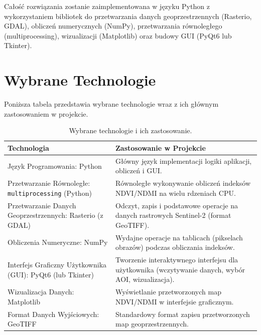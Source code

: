 \documentclass[12pt,a4paper]{article}
\begin{document}
\noindent Całość rozwiązania zostanie zaimplementowana w języku Python z wykorzystaniem bibliotek do przetwarzania danych geoprzestrzennych (Rasterio, GDAL), obliczeń numerycznych (NumPy), przetwarzania równoległego (multiprocessing), wizualizacji (Matplotlib) oraz budowy GUI (PyQt6 lub Tkinter).

\section{Wybrane Technologie}
\label{sec:technologies}
Poniższa tabela przedstawia wybrane technologie wraz z ich głównym zastosowaniem w projekcie.

\begin{table}[H]
    \centering
    \caption{Wybrane technologie i ich zastosowanie.}
    \label{tab:technologies}
    \begin{tabular}{>{\raggedright\arraybackslash}p{} >{\raggedright\arraybackslash}p{}}
        \toprule
        \textbf{Technologia} & \textbf{Zastosowanie w Projekcie} \\
        \midrule
        Język Programowania: Python & Główny język implementacji logiki aplikacji, obliczeń i GUI. \\
        \addlinespace
        Przetwarzanie Równoległe: \texttt{multiprocessing} (Python) & Równoległe wykonywanie obliczeń indeksów NDVI/NDMI na wielu rdzeniach CPU. \\
        \addlinespace
        Przetwarzanie Danych Geoprzestrzennych: Rasterio (z GDAL) & Odczyt, zapis i podstawowe operacje na danych rastrowych Sentinel-2 (format GeoTIFF). \\
        \addlinespace
        Obliczenia Numeryczne: NumPy & Wydajne operacje na tablicach (pikselach obrazów) podczas obliczania indeksów. \\
        \addlinespace
        Interfejs Graficzny Użytkownika (GUI): PyQt6 (lub Tkinter) & Tworzenie interaktywnego interfejsu dla użytkownika (wczytywanie danych, wybór AOI, wizualizacja). \\
        \addlinespace
        Wizualizacja Danych: Matplotlib & Wyświetlanie przetworzonych map NDVI/NDMI w interfejsie graficznym. \\
        \addlinespace
        Format Danych Wyjściowych: GeoTIFF & Standardowy format zapisu przetworzonych map geoprzestrzennych. \\
        \bottomrule
    \end{tabular}
\end{table}
\end{document}
